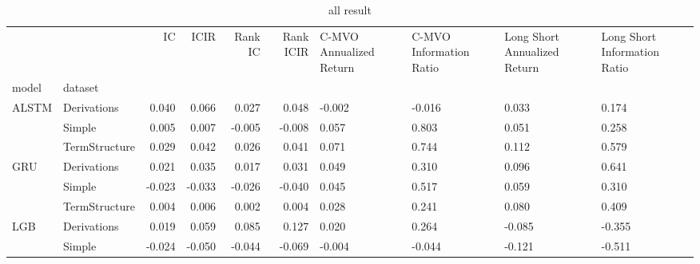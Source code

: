 \documentclass[10pt,letterpaper]{article}
\begin{document}
\begin{table}[!ht]
\begin{adjustwidth}{-2.25in}{0in} %
\centering
\caption{all result}
\begin{tabular}{llrrrrp{1.5cm}p{1.5cm}p{1.5cm}p{1.5cm}}
\toprule
    &               &     IC &   ICIR &  Rank IC &  Rank ICIR &  C-MVO Annualized Return &  C-MVO Information Ratio &  Long Short Annualized Return &  Long Short Information Ratio \\
model & dataset &        &        &          &            &                          &                          &                               &                               \\
\midrule
ALSTM & Derivations &  0.040 &  0.066 &    0.027 &      0.048 &                   -0.002 &                   -0.016 &                         0.033 &                         0.174 \\
    & Simple &  0.005 &  0.007 &   -0.005 &     -0.008 &                    0.057 &                    0.803 &                         0.051 &                         0.258 \\
    & TermStructure &  0.029 &  0.042 &    0.026 &      0.041 &                    0.071 &                    0.744 &                         0.112 &                         0.579 \\
\midrule
GRU & Derivations &  0.021 &  0.035 &    0.017 &      0.031 &                    0.049 &                    0.310 &                         0.096 &                         0.641 \\
    & Simple & -0.023 & -0.033 &   -0.026 &     -0.040 &                    0.045 &                    0.517 &                         0.059 &                         0.310 \\
    & TermStructure &  0.004 &  0.006 &    0.002 &      0.004 &                    0.028 &                    0.241 &                         0.080 &                         0.409 \\
\midrule
LGB & Derivations &  0.019 &  0.059 &    0.085 &      0.127 &                    0.020 &                    0.264 &                        -0.085 &                        -0.355 \\
    & Simple & -0.024 & -0.050 &   -0.044 &     -0.069 &                   -0.004 &                   -0.044 &                        -0.121 &                        -0.511 \\

\end{tabular}
\end{adjustwidth}
\end{table}
\end{document}

